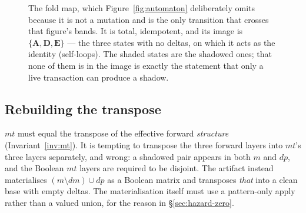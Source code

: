 \documentclass[11pt,a4paper]{article}
\theoremstyle{plain}
\theoremstyle{definition}
\theoremstyle{remark}
\begin{document}
\begin{figure}[t]
\centering
{}
\caption{The fold map, which Figure~\ref{fig:automaton} deliberately omits
because it is not a mutation and is the only transition that crosses that
figure's bands. It is total, idempotent, and its image is
$\{\mathbf{A},\mathbf{D},\mathbf{E}\}$ --- the three states with no deltas, on
which it acts as the identity (self-loops). The shaded states are the shadowed
ones; that none of them is in the image is exactly the statement that only a
live transaction can produce a shadow.}
\label{fig:fold}
\end{figure}

\subsection{Rebuilding the transpose}
\label{sec:rebuild}

$mt$ must equal the transpose of the effective forward \emph{structure}
(Invariant~\ref{inv:mt}). It is tempting to transpose the three forward
layers into $mt$'s three layers separately, and wrong: a shadowed pair
appears in both $m$ and $dp$, and the Boolean $mt$ layers are required to be
disjoint. The artifact instead materialises $(m \setminus dm) \cup dp$ as a
Boolean matrix and transposes \emph{that} into a clean base with empty
deltas. The materialisation itself must use a pattern-only apply rather than
a valued union, for the reason in \S\ref{sec:hazard-zero}.
\end{document}
